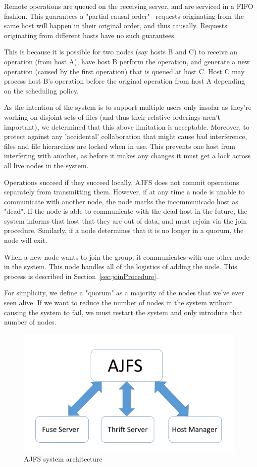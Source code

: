 Remote operations are queued on the receiving server, and are serviced in a FIFO
fashion. This guarantees a "partial causal order"-- requests originating
from the same host will happen in their original order, and thus causally.
Requests originating from different hosts have no such guarantees.

This is because it is possible for two nodes (say hosts B and C) to receive an
operation (from host A), have host B perform the operation, and generate a new
operation (caused by the first operation) that is queued at host C. Host C may
process host B's operation before the original operation from host A depending
on the scheduling policy.

As the intention of the system is to support multiple users only insofar as
they're working on disjoint sets of files (and thus their relative orderings
aren't important), we determined that this above limitation is acceptable.
Moreover, to protect against any 'accidental' collaboration that might cause bad
interference, files and file hierarchies are locked when in use. This prevents
one host from interfering with another, as before it makes any changes it must
get a lock across all live nodes in the system.

Operations succeed if they succeed locally. AJFS does not commit operations
separately from transmitting them. However, if at any time a node is unable to
communicate with another node, the node marks the incommunicado host as "dead".
If the node is able to communicate with the dead host in the future, the system
informs that host that they are out of data, and must rejoin via the join
procedure. Similarly, if a node determines that it is no longer in a quorum,
the node will exit.

When a new node wants to join the group, it communicates with one other node in
the system. This node handles all of the logistics of adding the node. This
process is described in Section~\ref{sec:joinProcedure}.

For simplicity, we define a "quorum" as a majority of the nodes that we've ever
seen alive. If we want to reduce the number of nodes in the system without
causing the system to fail, we must restart the system and only introduce that
number of nodes.

\begin{figure}[Ht]
\includegraphics[width=\linewidth]{architecture.pdf}
\caption{AJFS system architecture}
\label{fig:architecture}
\vspace{-5mm}
\end{figure}

